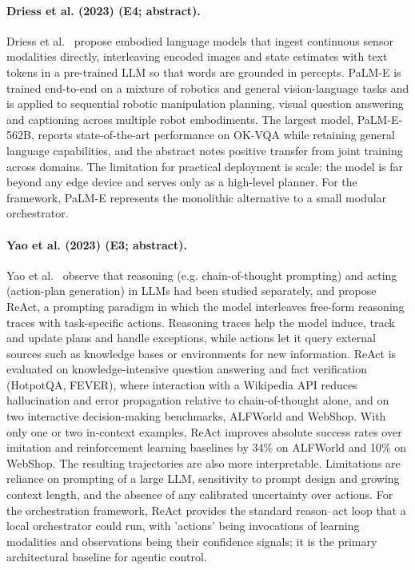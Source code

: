 \documentclass[10pt,a4paper]{article}
\begin{document}
\paragraph{Driess et al. (2023) (E4; abstract).} Driess et al.~\cite{Driess2023} propose embodied language models that ingest continuous sensor modalities directly, interleaving encoded images and state estimates with text tokens in a pre-trained LLM so that words are grounded in percepts. PaLM-E is trained end-to-end on a mixture of robotics and general vision-language tasks and is applied to sequential robotic manipulation planning, visual question answering and captioning across multiple robot embodiments. The largest model, PaLM-E-562B, reports state-of-the-art performance on OK-VQA while retaining general language capabilities, and the abstract notes positive transfer from joint training across domains. The limitation for practical deployment is scale: the model is far beyond any edge device and serves only as a high-level planner. For the framework, PaLM-E represents the monolithic alternative to a small modular orchestrator.

\paragraph{Yao et al. (2023) (E3; abstract).} Yao et al.~\cite{Yao2023a} observe that reasoning (e.g. chain-of-thought prompting) and acting (action-plan generation) in LLMs had been studied separately, and propose ReAct, a prompting paradigm in which the model interleaves free-form reasoning traces with task-specific actions. Reasoning traces help the model induce, track and update plans and handle exceptions, while actions let it query external sources such as knowledge bases or environments for new information. ReAct is evaluated on knowledge-intensive question answering and fact verification (HotpotQA, FEVER), where interaction with a Wikipedia API reduces hallucination and error propagation relative to chain-of-thought alone, and on two interactive decision-making benchmarks, ALFWorld and WebShop. With only one or two in-context examples, ReAct improves absolute success rates over imitation and reinforcement learning baselines by 34\% on ALFWorld and 10\% on WebShop. The resulting trajectories are also more interpretable. Limitations are reliance on prompting of a large LLM, sensitivity to prompt design and growing context length, and the absence of any calibrated uncertainty over actions. For the orchestration framework, ReAct provides the standard reason--act loop that a local orchestrator could run, with 'actions' being invocations of learning modalities and observations being their confidence signals; it is the primary architectural baseline for agentic control.
\end{document}
